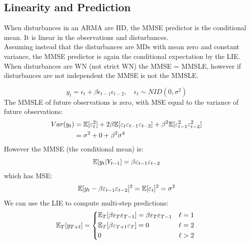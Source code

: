 \documentclass[DIV=14,titlepage=false]{scrreprt}
\begin{document}
\subsection{Linearity and Prediction}
When disturbances in an ARMA are IID, the MMSE predictor is the conditional mean. It is linear in the observations and disturbances.\\
Assuming instead that the disturbances are MDs with mean zero and constant variance, the MMSE predictor is again the conditional expectation by the LIE.\\
When disturbances are WN (not strict WN) the MMSE = MMSLE, however if disturbances are not independent the MMSE is not the MMSLE.
\begin{example}
    \[
        y_t = \epsilon_t + \beta \epsilon_{t-1} \epsilon_{t-2}, \quad \epsilon_t \sim NID(0,\sigma^2)
    \]
The MMSLE of future observations is zero, with MSE equal to the variance of future observations:
\begin{align*}
    Var(y_t) &= \mathbb{E}[\varepsilon_t^2] + 2 \beta \mathbb{E}[\varepsilon_t \varepsilon_{t-1} \varepsilon_{t-2}] + \beta^2 \mathbb{E}[\varepsilon_{t-1}^2 \varepsilon_{t-2}^2]\\
    &= \sigma^2 + 0 + \beta^2 \sigma^4 
\end{align*}
However the MMSE (the conditional mean) is:
\[
    \mathbb{E}[y_t|Y_{t-1}] = \beta \varepsilon_{t-1} \varepsilon_{t-2}
\]
which has MSE:
\[
    \mathbb{E}[y_t - \beta \varepsilon_{t-1} \varepsilon_{t-2}]^2 = \mathbb{E}[\varepsilon_t]^2 = \sigma^2
\]
We can use the LIE to compute multi-step predictions:
\[
        \E_T[y_{T+\ell}] = \begin{cases*}
            \E_T[\beta \epsilon_{T} \epsilon_{T-1}] = \beta \epsilon_{T} \epsilon_{T-1} & $\ell = 1$\\
            \E_T[\beta \epsilon_{T+1} \epsilon_{T}] = 0 & $\ell = 2$\\
             0 & $\ell > 2$
        \end{cases*}
\]
\end{example}
\end{document}
